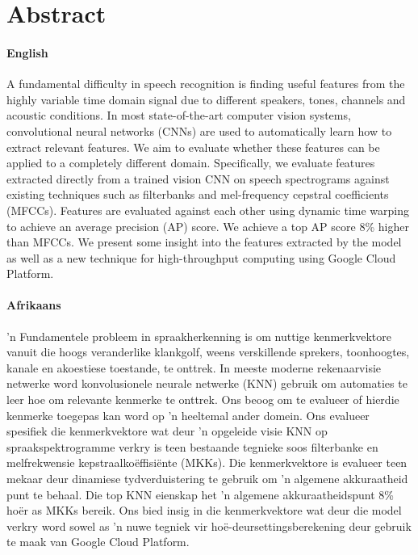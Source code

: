 \chapter*{Abstract}
\makeatletter{}\makeatother

\subsubsection*{English}

A fundamental difficulty in speech recognition is finding useful features from the highly variable time domain signal due to different speakers, tones, channels and acoustic conditions.
In most state-of-the-art computer vision systems, convolutional neural networks (CNNs) are used to automatically learn how to extract relevant features.
We aim to evaluate whether these features can be applied to a completely different domain.
Specifically, we evaluate features extracted directly from a trained vision CNN on speech spectrograms against existing techniques such as filterbanks and mel-frequency cepstral coefficients (MFCCs).
Features are evaluated against each other using dynamic time warping to achieve an average precision (AP) score.
We achieve a top AP score 8\% higher than MFCCs.
We present some insight into the features extracted by the model as well as a new technique for high-throughput computing using Google Cloud Platform.


\subsubsection*{Afrikaans}

'n Fundamentele probleem in spraakherkenning is om nuttige kenmerkvektore vanuit die hoogs veranderlike klankgolf, weens verskillende sprekers, toonhoogtes, kanale en akoestiese toestande, te onttrek.
In meeste moderne rekenaarvisie netwerke word konvolusionele neurale netwerke (KNN) gebruik om automaties te leer hoe om relevante kenmerke te onttrek.
Ons beoog om te evalueer of hierdie kenmerke toegepas kan word op 'n heeltemal ander domein.
Ons evalueer spesifiek die kenmerkvektore wat deur 'n opgeleide visie KNN op spraakspektrogramme verkry is teen bestaande tegnieke soos filterbanke en melfrekwensie kepstraalko\"{e}ffisi\"{e}nte (MKKs).
Die kenmerkvektore is evalueer teen mekaar deur dinamiese tydverduistering te gebruik om 'n algemene akkuraatheid punt te behaal.
Die top KNN eienskap het 'n algemene akkuraatheidspunt 8\% ho\"{e}r as MKKs bereik.
Ons bied insig in die kenmerkvektore wat deur die model verkry word sowel as 'n nuwe tegniek vir ho\"{e}-deursettingsberekening deur gebruik te maak van Google Cloud Platform.

